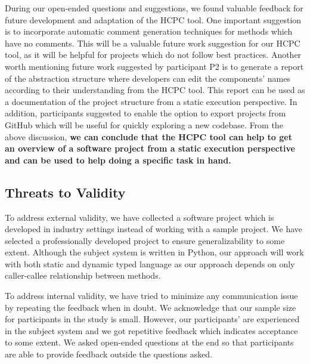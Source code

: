 During our open-ended questions and suggestions, we found valuable feedback for future development and adaptation of the HCPC tool. One important suggestion is to incorporate automatic comment generation techniques for methods which have no comments. This will be a valuable future work suggestion for our HCPC tool, as it will be helpful for projects which do not follow best practices. Another worth mentioning future work suggested by participant P2 is to generate a report of the abstraction structure where developers can edit the components' names according to their understanding from the HCPC tool. This report can be used as a documentation of the project structure from a static execution perspective. In addition, participants suggested to enable the option to export projects from GitHub which will be useful for quickly exploring a new codebase. From the above discussion, \textbf{we can conclude that the HCPC tool can help to get an overview of a software project from a static execution perspective and can be used to help doing a specific task in hand.}




\subsection{Threats to Validity}
To address external validity, we have collected a software project which is developed in industry settings instead of working with a sample project. We have selected a professionally developed project to ensure generalizability to some extent. Although the subject system is written in Python, our approach will work with both static and dynamic typed language as our approach depends on only caller-callee relationship between methods. 

To address internal validity, we have tried to minimize any communication issue by repeating the feedback when in doubt. We acknowledge that our sample size for participants in the study is small. However, our participants' are experienced in the subject system and we got repetitive feedback which indicates acceptance to some extent. We asked open-ended questions at the end so that participants are able to provide feedback outside the questions asked. 




